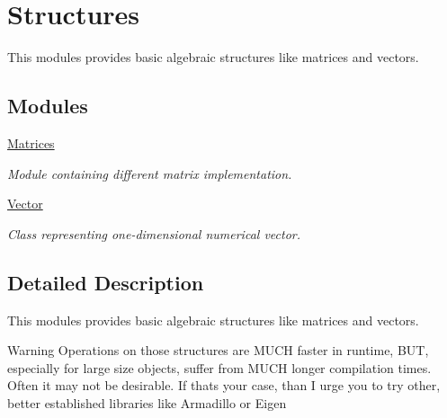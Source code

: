 \hypertarget{group__numpp__structures}{}\section{Structures}
\label{group__numpp__structures}


This modules provides basic algebraic structures like matrices and vectors.  


\subsection*{Modules}
\begin{DoxyCompactItemize}
\item 
\hyperlink{group__numpp__structures__matrices}{Matrices}
\begin{DoxyCompactList}\small\item\em Module containing different matrix implementation. \end{DoxyCompactList}\item 
\hyperlink{group__numpp__structures__vector}{Vector}
\begin{DoxyCompactList}\small\item\em Class representing one-\/dimensional numerical vector. \end{DoxyCompactList}\end{DoxyCompactItemize}


\subsection{Detailed Description}
This modules provides basic algebraic structures like matrices and vectors. 

{\bfseries \begin{DoxyWarning}{Warning}
Operations on those structures are M\+U\+CH faster in runtime, B\+UT, especially for large size objects, suffer from M\+U\+CH longer compilation times.~\newline
 Often it may not be desirable. If that\textquotesingle{}s your case, than I urge you to try other, better established libraries like Armadillo or Eigen  
\end{DoxyWarning}
}